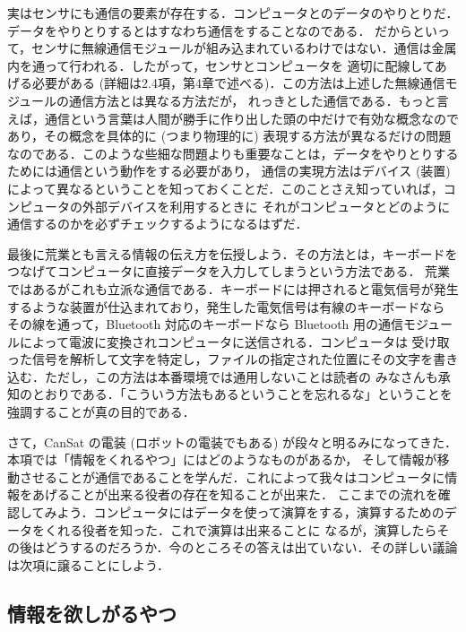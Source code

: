 \documentclass[dvipdfmx]{jsbook}
\begin{document}
  実はセンサにも通信の要素が存在する．コンピュータとのデータのやりとりだ．データをやりとりするとはすなわち通信をすることなのである．
  だからといって，センサに無線通信モジュールが組み込まれているわけではない．通信は金属内を通って行われる．したがって，センサとコンピュータを
  適切に配線してあげる必要がある (詳細は2.4項，第4章で述べる)．この方法は上述した無線通信モジュールの通信方法とは異なる方法だが，
  れっきとした通信である．もっと言えば，通信という言葉は人間が勝手に作り出した頭の中だけで有効な概念なのであり，その概念を具体的に (つまり物理的に)
  表現する方法が異なるだけの問題なのである．このような些細な問題よりも重要なことは，データをやりとりするためには通信という動作をする必要があり，
  通信の実現方法はデバイス (装置) によって異なるということを知っておくことだ．このことさえ知っていれば，コンピュータの外部デバイスを利用するときに
  それがコンピュータとどのように通信するのかを必ずチェックするようになるはずだ．

  最後に荒業とも言える情報の伝え方を伝授しよう．その方法とは，キーボードをつなげてコンピュータに直接データを入力してしまうという方法である．
  荒業ではあるがこれも立派な通信である．キーボードには押されると電気信号が発生するような装置が仕込まれており，発生した電気信号は有線のキーボードなら
  その線を通って，Bluetooth 対応のキーボードなら Bluetooth 用の通信モジュールによって電波に変換されコンピュータに送信される．コンピュータは
  受け取った信号を解析して文字を特定し，ファイルの指定された位置にその文字を書き込む．ただし，この方法は本番環境では通用しないことは読者の
  みなさんも承知のとおりである．「こういう方法もあるということを忘れるな」ということを強調することが真の目的である．

  さて，CanSat の電装 (ロボットの電装でもある) が段々と明るみになってきた．本項では「情報をくれるやつ」にはどのようなものがあるか，
  そして情報が移動させることが通信であることを学んだ．これによって我々はコンピュータに情報をあげることが出来る役者の存在を知ることが出来た．
  ここまでの流れを確認してみよう．コンピュータにはデータを使って演算をする，演算するためのデータをくれる役者を知った．これで演算は出来ることに
  なるが，演算したらその後はどうするのだろうか．今のところその答えは出ていない．その詳しい議論は次項に譲ることにしよう．


\subsection{情報を欲しがるやつ}
\label{subsub:情報を欲しがるやつ}
\end{document}
